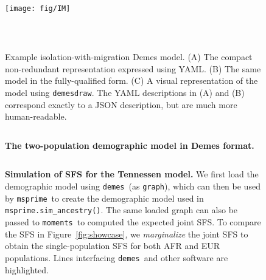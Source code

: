 \documentclass[11pt]{article}
\newcommand{\msprime}[0]{\texttt{msprime}}
\newcommand{\demes}[0]{\texttt{demes}}
\newcommand{\moments}[0]{\texttt{moments}}
\begin{document}
\begin{figure}[h!]
    \begin{minipage}{0.44\textwidth}
        \begin{tcolorbox}
            \inputminted[fontsize=\scriptsize,linenos,numbersep=5pt]{yaml}{models/IM.yaml}
        \end{tcolorbox}
        \begin{tcolorbox}
            \texttt{[image: fig/IM]}
        \end{tcolorbox}
    \end{minipage}\hfill
    \begin{minipage}{0.54\textwidth}
        \begin{tcolorbox}
            \inputminted[fontsize=\scriptsize,linenos,numbersep=5pt]{yaml}{models/IM-resolved.yaml}
        \end{tcolorbox}
    \end{minipage}\\
    \caption{
        \label{fig:IM}
        Example isolation-with-migration Demes model. (A) The compact non-redundant
        representation expressed using YAML. (B) The same model in the fully-qualified
        form. (C) A visual representation of the model using \texttt{demesdraw}.
        The YAML descriptions in (A) and (B) correspond exactly to a JSON description,
        but are much more human-readable.
    }
\end{figure}

\begin{figure}[h!]
    \begin{tcolorbox}
        \inputminted[fontsize=\scriptsize,linenos,numbersep=5pt]{yaml}{models/tennessen.yml}
    \end{tcolorbox}
    \caption{
        \textbf{The \citet{tennessen2012evolution} two-population demographic model in Demes format.}
    }
    \label{fig:tennessen}
\end{figure}

\begin{figure}[h!]
    \begin{tcolorbox}
        \inputminted[fontsize=\scriptsize,linenos,numbersep=5pt,highlightlines={9,19,52}]{python}{models/tennessen-simulation.py}
    \end{tcolorbox}
    \caption{
        \textbf{Simulation of SFS for the Tennessen model.}
        We first load the demographic model using \demes\ (as \texttt{graph}),
        which can then be used by \msprime\ to create the demographic model used in
        \texttt{msprime.sim\_ancestry()}. The same loaded graph can also be
        passed to \moments\ to computed the expected joint SFS.
        To compare the SFS in Figure~\ref{fig:showcase}, we \emph{marginalize} the
        joint SFS to obtain the single-population SFS for both AFR and EUR populations.
        Lines interfacing \demes\ and other software are highlighted.
    }
    \label{fig:tennessen-simulation}
\end{figure}
\end{document}
